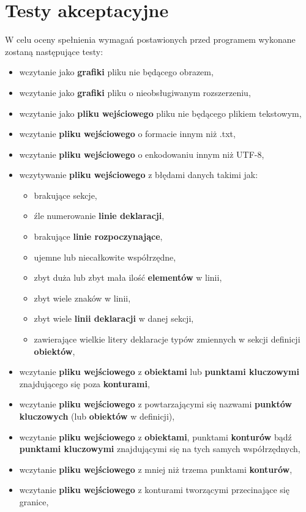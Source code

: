 \documentclass[a4paper, 10pt, titlepage]{article}
\begin{document}
\section{Testy akceptacyjne}
W celu oceny spełnienia wymagań postawionych przed programem wykonane zostaną następujące testy:
\begin{itemize}
\item wczytanie jako \textbf{grafiki} pliku nie będącego obrazem,
\item wczytanie jako \textbf{grafiki} pliku o nieobsługiwanym rozszerzeniu,
\item wczytanie jako \textbf{pliku wejściowego} pliku nie będącego plikiem tekstowym,
\item wczytanie \textbf{pliku wejściowego} o formacie innym niż .txt,
\item wczytanie \textbf{pliku wejściowego} o enkodowaniu innym niż UTF-8,
\item wczytywanie \textbf{pliku wejściowego} z błędami danych takimi jak:
\begin{itemize}
\item brakujące sekcje,
\item źle numerowanie \textbf{linie deklaracji},
\item brakujące \textbf{linie rozpoczynające},
\item ujemne lub niecałkowite współrzędne,
\item zbyt duża lub zbyt mała ilość \textbf{elementów} w linii,
\item zbyt wiele znaków w linii,
\item zbyt wiele \textbf{linii deklaracji} w danej sekcji,
\item zawierające wielkie litery deklaracje typów zmiennych w sekcji definicji \textbf{obiektów},
\end{itemize}
\item wczytanie \textbf{pliku wejściowego} z \textbf{obiektami} lub \textbf{punktami kluczowymi} znajdującego się poza \textbf{konturami},
\item wczytanie \textbf{pliku wejściowego} z powtarzającymi się nazwami \textbf{punktów kluczowych} (lub \textbf{obiektów} w definicji),
\item wczytanie \textbf{pliku wejściowego} z \textbf{obiektami}, punktami \textbf{konturów} bądź \textbf{punktami kluczowymi} znajdującymi się na tych samych współrzędnych,
\item wczytanie \textbf{pliku wejściowego} z mniej niż trzema punktami \textbf{konturów},
\item wczytanie \textbf{pliku wejściowego} z konturami tworzącymi przecinające się granice,

\end{itemize}
\end{document}
